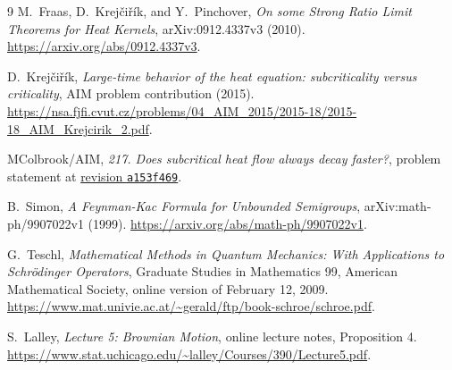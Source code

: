 \documentclass[11pt,a4paper]{article}
\begin{document}
\begin{thebibliography}{9}
M.~Fraas, D.~Krej\v{c}i\v{r}\'ik, and Y.~Pinchover,
\emph{On some Strong Ratio Limit Theorems for Heat Kernels},
arXiv:0912.4337v3 (2010).
\url{https://arxiv.org/abs/0912.4337v3}.

D.~Krej\v{c}i\v{r}\'ik,
\emph{Large-time behavior of the heat equation: subcriticality versus criticality},
AIM problem contribution (2015).
\url{https://nsa.fjfi.cvut.cz/problems/04_AIM_2015/2015-18/2015-18_AIM_Krejcirik_2.pdf}.

MColbrook/AIM, \emph{217. Does subcritical heat flow always decay faster?},
problem statement at
\href{https://github.com/MColbrook/AIM/blob/a153f469ee0ea64e876b2ad97c79d252c19a3e22/problems/217-critical-subcritical-heat-ratio.md}{revision \texttt{a153f469}}.

B.~Simon, \emph{A Feynman-Kac Formula for Unbounded Semigroups},
arXiv:math-ph/9907022v1 (1999).
\url{https://arxiv.org/abs/math-ph/9907022v1}.

G.~Teschl, \emph{Mathematical Methods in Quantum Mechanics: With Applications
to Schr\"odinger Operators}, Graduate Studies in Mathematics 99,
American Mathematical Society, online version of February 12,
2009. \url{https://www.mat.univie.ac.at/~gerald/ftp/book-schroe/schroe.pdf}.

S.~Lalley, \emph{Lecture 5: Brownian Motion}, online lecture notes,
Proposition 4.
\url{https://www.stat.uchicago.edu/~lalley/Courses/390/Lecture5.pdf}.
\end{thebibliography}
\end{document}
